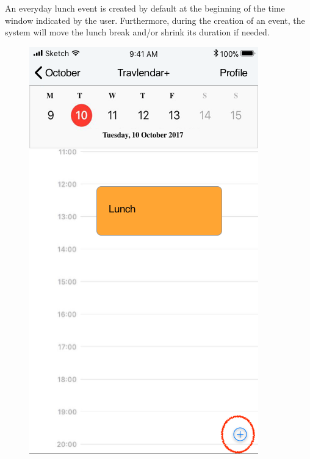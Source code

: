 \newpage
{}
An everyday lunch event is created by default at the beginning of the time window indicated by the user. Furthermore, during the creation of an event, the system will move the lunch break and/or shrink its duration if needed.
\begin{figure}[H]
	\centering
	\includegraphics[scale=0.23]{Images/Interface/Lunch/1_calendar+lunch}
	\hspace{0.5cm}

\end{figure}
